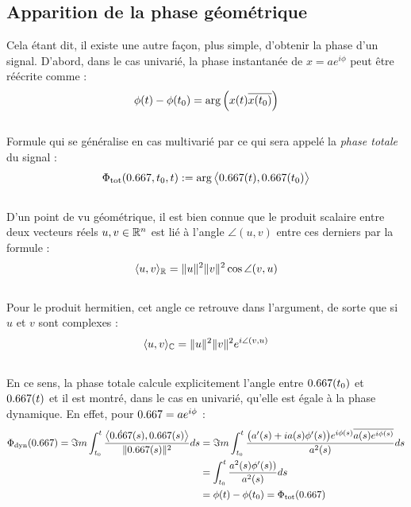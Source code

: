 \subsection{Apparition de la phase géométrique}\label{subsec:intro_phaseg}

Cela étant dit, il existe une autre façon, plus simple, d'obtenir la phase d'un signal. D'abord, dans le cas univarié, la phase instantanée de $x=ae^{i\phi}$ peut être réécrite comme :
\[\phi(t)-\phi(t_0)  = \arg\left( x(t) \overline{x(t_0)} \right)\]
\\
Formule qui se généralise en cas multivarié par ce qui sera appelé la \emph{phase totale} du signal :
\begin{equation}\label{eq:phase_t}
	\phaset(\x, t_0, t) \defeq \arg\big\langle \x(t), \x(t_0)\big\rangle
\end{equation}
\\
D'un point de vu géométrique, il est bien connue que le produit scalaire entre deux vecteurs réels $u,v\in\mathbb{R}^n$ est lié à l'angle $\angle(u,v)$ entre ces derniers par la formule :
\[\langle u,v\rangle_{\mathbb{R}} = \|u\|^2 \|v\|^2 \cos \angle(v,u)\]
\\
Pour le produit hermitien, cet angle ce retrouve dans l'argument, de sorte que si $u$ et $v$ sont complexes :
\[\langle u,v\rangle_{\mathbb{C}} = \|u\|^2 \|v\|^2 e^{i \angle(v,u)}\]
\\
En ce sens, la phase totale calcule explicitement l'angle entre $\x(t_0)$ et $\x(t)$ et il est montré, dans le cas en univarié, qu'elle est égale à la phase dynamique. En effet, pour $\x = ae^{i\phi}$ :
\begin{align*}
	\phased(\x) = \Im m\int_{t_0}^t \frac{\big\langle \dot{\x}(s) , \x(s) \big\rangle}{\|\x(s)\|^2} ds &= \Im m \int_{t_0}^t \frac{\big(a'(s) + ia(s)\phi'(s) \big) e^{i\phi(s)} \congu{a(s) e^{i\phi(s)}}}{a^2(s)} ds \\
	&= \int_{t_0}^t \frac{a^2(s)\phi'(s))}{a^2(s)} ds \\
	&= \phi(t) - \phi(t_0) = \phaset(\x)
\end{align*}
\skipl


